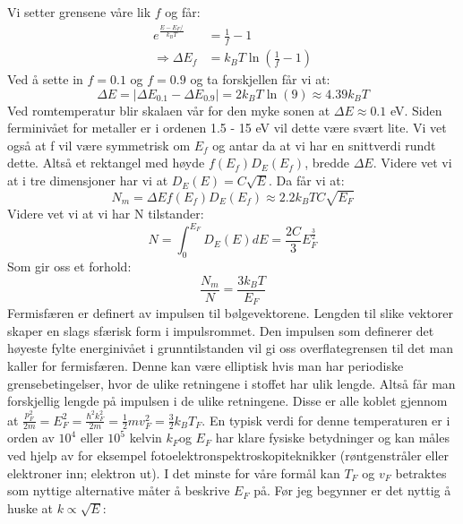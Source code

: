 \documentclass{article}
\begin{document}
Vi setter grensene våre lik $f$ og får:
\begin{align}
    e ^{\frac{E-E_F /}{k_BT}}&= \frac{1}{f} - 1 \\
    \Rightarrow \Delta E_f &= k_BT \ln ( \frac{1}{f} - 1 )
\end{align}
Ved å sette in $f=0.1$ og $f=0.9$ og ta forskjellen får vi at:
\begin{equation}
    \Delta E = |\Delta E_0.1-\Delta E_0.9| = 2 k_BT \ln(9) \approx 4.39 k_BT
\end{equation}
Ved romtemperatur blir skalaen vår for den myke sonen at $\Delta E \approx 0.1 $ eV. Siden ferminivået for metaller er i ordenen 1.5 - 15 eV vil dette  være svært lite. Vi vet også at f vil være symmetrisk om $E_f$ og antar da at vi har en snittverdi rundt dette. Altså et rektangel med høyde $f(E_f) D_E(E_f)$, bredde $\Delta E$. Videre vet vi at i tre dimensjoner har vi at $D_E(E) = C \sqrt{E}$. Da får vi at:
\begin{equation}
    N_m =\Delta E f(E_f) D_E(E_f) \approx 2.2 k_BT C \sqrt{E_F}
\end{equation}
Videre vet vi at vi har N tilstander:
\begin{equation}
    N = \int_0^{E_F} D_E(E) dE = \frac{2C}{3} E_F^{\frac{3}{2}}
\end{equation}
Som gir oss et forhold:
\begin{equation}
    \frac{N_m}{N} = \frac{3 k_BT}{E_F}
\end{equation}
\nyside
{}
Fermisfæren er definert av impulsen til bølgevektorene. Lengden til slike vektorer skaper en slags sfærisk form i impulsrommet. Den impulsen som definerer det høyeste fylte energinivået i grunntilstanden vil gi oss overflategrensen til det man kaller for fermisfæren. Denne kan være elliptisk hvis man har periodiske grensebetingelser, hvor de ulike retningene i stoffet har ulik lengde. Altså får man forskjellig lengde på impulsen i de ulike retningene.
Disse er alle koblet gjennom at $\frac{p_F^2}{2m} = E_F^2 = \frac{\hbar^2 k_F^2}{2m} = \frac{1}{2} mv_F^2 = \frac{3}{2} k_BT_F$. En typisk verdi for denne temperaturen er i orden av $10^4$ eller $10^5$ kelvin
$k_F $og $E_F$ har klare fysiske betydninger og kan måles ved hjelp av for eksempel fotoelektronspektroskopiteknikker (røntgenstråler eller elektroner inn; elektron ut). I det minste for våre formål kan $T_F$ og $v_F$ betraktes som nyttige alternative måter å beskrive $E_F$ på.
Før jeg begynner er det nyttig å huske at $k \propto \sqrt{E}$:
\end{document}
